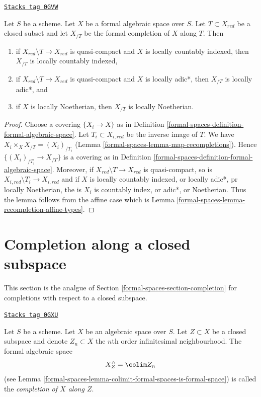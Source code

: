 \begin{lemma}
\label{formal-spaces-lemma-recompletion-types}
\href{https://stacks.math.columbia.edu/tag/0GVW}{\texttt{Stacks tag 0GVW}}

Let $S$ be a scheme. Let $X$ be a formal algebraic space over $S$.
Let $T \subset X_{red}$ be a closed subset and let $X_{/T}$
be the formal completion of $X$ along $T$. Then
\begin{enumerate}
\item if $X_{red} \setminus T \to X_{red}$ is quasi-compact and $X$
is locally countably indexed, then $X_{/T}$ is locally countably indexed,
\item if $X_{red} \setminus T \to X_{red}$ is quasi-compact and $X$
is locally adic*, then $X_{/T}$ is locally adic*, and
\item if $X$ is locally Noetherian, then $X_{/T}$ is locally Noetherian.
\end{enumerate}
\end{lemma}

\begin{proof}
Choose a covering $\{X_i \to X\}$ as in
Definition \ref{formal-spaces-definition-formal-algebraic-space}.
Let $T_i \subset X_{i, red}$ be the inverse image of $T$.
We have $X_i \times_X X_{/T} = (X_i)_{/T_i}$
(Lemma \ref{formal-spaces-lemma-map-recompletions}).
Hence $\{(X_i)_{/T_i} \to X_{/T}\}$ is a covering as in
Definition \ref{formal-spaces-definition-formal-algebraic-space}.
Moreover, if $X_{red} \setminus T \to X_{red}$ is quasi-compact, so is
$X_{i, red} \setminus T_i \to X_{i, red}$
and if $X$ is locally countably indexed, or locally adic*, pr
locally Noetherian, the is $X_i$ is countably index, or adic*,
or Noetherian. Thus the lemma follows from the affine case which is
Lemma \ref{formal-spaces-lemma-recompletion-affine-types}.
\end{proof}

\section{Completion along a closed subspace}
\label{formal-spaces-section-completion-subspace}
This section is the analgue of Section \ref{formal-spaces-section-completion}
for completions with respect to a closed subspace.

\begin{definition}
\label{formal-spaces-definition-completion-subspace}
\href{https://stacks.math.columbia.edu/tag/0GXU}{\texttt{Stacks tag 0GXU}}

Let $S$ be a scheme. Let $X$ be an algebraic space over $S$.
Let $Z \subset X$ be a closed subspace and denote $Z_n \subset X$
the $n$th order infinitesimal neighbourhood. The formal algebraic space
$$
X^\wedge_Z = \colim Z_n
$$
(see Lemma \ref{formal-spaces-lemma-colimit-formal-spaces-is-formal-space})
is called the {\it completion of $X$ along $Z$}.
\end{definition}

